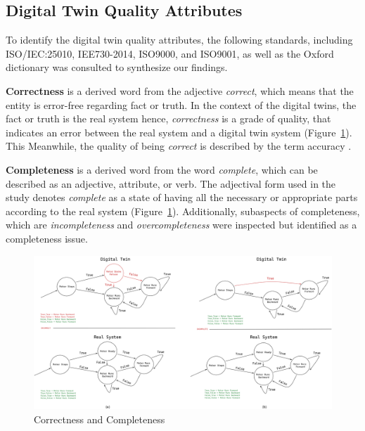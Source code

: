 \documentclass{llncs}
\begin{document}
    \subsection{Digital Twin Quality Attributes}\label{section:Digital Twin Quality Attributes}
    To identify the digital twin quality attributes, the following standards, including ISO/IEC:25010, IEE730-2014, ISO9000, and ISO9001, 
    as well as the Oxford dictionary was consulted to 
    synthesize our findings\cite{ISO9000,ISO90012015,ISO/IEC:25010,IEE730-2014, OxfordDictionary}.
    
    
    \textbf{Correctness} is a  derived word from the adjective \textit{correct}, which means that the entity is error-free regarding fact or truth. 
    In the context of the digital twins, the fact or truth is the real system hence, \textit{correctness} is a grade of quality, 
    that indicates an error between the real system and a digital twin system (Figure~\ref{fig:CorrectnessAndCompleteness}). This 
    Meanwhile, the quality of being \textit{correct} is described by the term accuracy \cite{OxfordDictionary}. 
    
    \textbf{Completeness} is a derived word from the word  \textit{complete}, which can be described as an adjective, attribute, or verb\cite{OxfordDictionary}. 
    The adjectival form used in the study denotes \textit{complete} as a state of having all the necessary or appropriate parts according to the real system 
    (Figure~\ref{fig:CorrectnessAndCompleteness}). Additionally, subaspects of completeness, which are \textit{incompleteness} and \textit{overcompleteness} 
    were inspected but identified as a completeness issue.  
    
    \begin{figure}
        
        \centering
            \includegraphics[width = 1\textwidth]{Correctness and Completeness.png}
            \caption{Correctness and Completeness}\label{fig:CorrectnessAndCompleteness}
    \end{figure}
\end{document}
